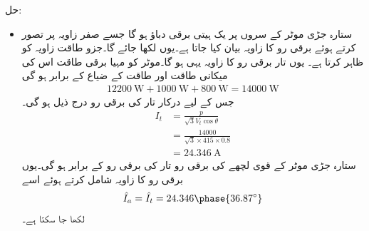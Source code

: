 حل:
\begin{itemize}
\item
ستارہ جڑی موٹر کے سروں پر یک ہیتی برقی دباؤ   ہو گا جسے صفر زاویہ پر تصور کرتے ہوئے برقی رو کا زاویہ بیان کیا جاتا ہے۔یوں  لکھا جائے گا۔جزو طاقت  زاویہ   کو ظاہر کرتا ہے۔ یوں تار برقی رو کا  زاویہ یہی ہو گا۔موٹر کو مہیا برقی طاقت اس کی میکانی طاقت اور طاقت کے ضیاع کے برابر ہو گی
\begin{align*}
\SI{12200}{\watt}+\SI{1000}{\watt}+\SI{800}{\watt}=\SI{14000}{\watt}
\end{align*}
جس  کے لیے درکار تار کی برقی رو درج ذیل ہو گی۔ 
\begin{align*}
I_t&=\frac{p}{\sqrt{3} V_{t} \cos \theta}\\
&=\frac{\num{14000}}{\sqrt{3} \times 415 \times 0.8}\\
&=\SI{24.346}{\ampere}
\end{align*}
ستارہ جڑی موٹر کے قوی لچھے کی برقی رو تار کی  برقی رو کے برابر ہو گی۔یوں برقی رو کا زاویہ شامل کرتے ہوئے اسے 
\begin{align*}
\hat{I}_a=\hat{I}_t=24.346 \phase {36.87 ^{\circ}}
\end{align*}
لکھا جا سکتا ہے۔


\end{itemize}
